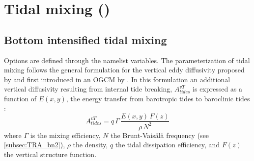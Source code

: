 \documentclass[../tex_main/NEMO_manual]{subfiles}
\begin{document}
\section{Tidal mixing (\protect{})}
\label{sec:ZDF_tmx}



\subsection{Bottom intensified tidal mixing}
\label{subsec:ZDF_tmx_bottom}

Options are defined through the   namelist variables.
The parameterization of tidal mixing follows the general formulation for 
the vertical eddy diffusivity proposed by \citet{St_Laurent_al_GRL02} and 
first introduced in an OGCM by \citep{Simmons_al_OM04}. 
In this formulation an additional vertical diffusivity resulting from internal tide breaking, 
$A^{vT}_{tides}$ is expressed as a function of $E(x,y)$, the energy transfer from barotropic 
tides to baroclinic tides : 
\begin{equation} \label{eq:Ktides}
A^{vT}_{tides} =  q \,\Gamma \,\frac{ E(x,y) \, F(z) }{ \rho \, N^2 }
\end{equation}
where $\Gamma$ is the mixing efficiency, $N$ the Brunt-Vais\"{a}l\"{a} frequency 
(see \autoref{subsec:TRA_bn2}), $\rho$ the density, $q$ the tidal dissipation efficiency, 
and $F(z)$ the vertical structure function. 
\end{document}
